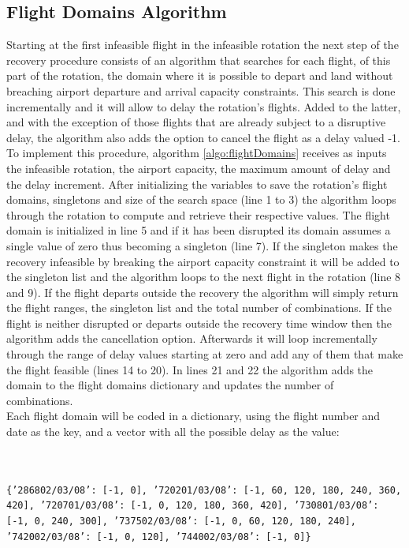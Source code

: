 
\subsection{Flight Domains Algorithm} \label{sec:flightDomains}
Starting at the first infeasible flight in the infeasible rotation the next step of the recovery procedure consists of an algorithm that searches for each flight, of this part of the rotation, the domain where it is possible to depart and land without breaching airport departure and arrival capacity constraints. This search is done incrementally and it will allow to delay the rotation’s flights. Added to the latter, and with the exception of those flights that are already subject to a disruptive delay, the algorithm also adds the option to cancel the flight as a delay valued -1. To implement this procedure, algorithm \ref{algo:flightDomains} receives as inputs the infeasible rotation, the airport capacity, the maximum amount of delay and the delay increment. After initializing the variables to save the rotation's flight domains, singletons and size of the search space (line 1 to 3) the algorithm loops through the rotation to compute and retrieve their respective values. The flight domain is initialized in line 5 and if it has been disrupted its domain assumes a single value of zero thus becoming a singleton (line 7). If the singleton makes the recovery infeasible by breaking the airport capacity constraint it will be added to the singleton list and the algorithm loops to the next flight in the rotation (line 8 and 9). If the flight departs outside the recovery the algorithm will simply return the flight ranges, the singleton list and the total number of combinations. If the flight is neither disrupted or departs outside the recovery time window then the algorithm adds the cancellation option. Afterwards it will loop incrementally through the range of delay values starting at zero and add any of them that make the flight feasible (lines 14 to 20). In lines 21 and 22 the algorithm adds the domain to the flight domains dictionary and updates the number of combinations. \\
Each flight domain will be coded in a dictionary, using the flight number and date as the key, and a vector with all the possible delay as the value:


{\texttt{\footnotesize \\ \\ \{'286802/03/08': [-1, 0],
		'720201/03/08': [-1, 60, 120, 180, 240, 360, 420],
		'720701/03/08': [-1, 0, 120, 180, 360, 420],
		'730801/03/08': [-1, 0, 240, 300],
		'737502/03/08': [-1, 0, 60, 120, 180, 240],
		'742002/03/08': [-1, 0, 120],
		'744002/03/08': [-1, 0]\}}}\\ \\	

